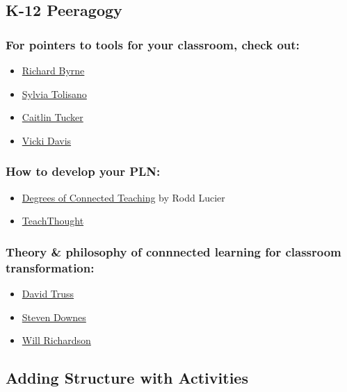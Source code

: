 \subsection{K-12 Peeragogy}

\subsubsection{For pointers to tools for your classroom, check out:}

\begin{itemize}
\item
  \href{http://www.freetech4teachers.com/}{Richard Byrne}
\item
  \href{http://langwitches.org/blog/}{Sylvia Tolisano}
\item
  \href{http://catlintucker.com/2011/11/12-tech-tools-that-will-transform-your-classroom/}{Caitlin
  Tucker}
\item
  \href{http://coolcatteacher.blogspot.ca/}{Vicki Davis}
\end{itemize}
\subsubsection{How to develop your PLN:}

\begin{itemize}
\item
  \href{\%20http://thecleversheep.blogspot.ca/2012/06/seven-degrees-of-connectedness\_06.html}{Degrees
  of Connected Teaching} by Rodd Lucier
\item
  \href{\%20http://thecleversheep.blogspot.ca/2012/06/seven-degrees-of-connectedness\_06.html}{TeachThought}
\end{itemize}
\subsubsection{Theory \& philosophy of connnected learning for classroom
transformation:}

\begin{itemize}
\item
  \href{http://pairadimes.davidtruss.com/}{David Truss}
\item
  \href{http://www.downes.ca/presentation/264}{Steven Downes}
\item
  \href{http://willrichardson.com/}{Will Richardson}
\end{itemize}
\subsection{Adding Structure with Activities}

